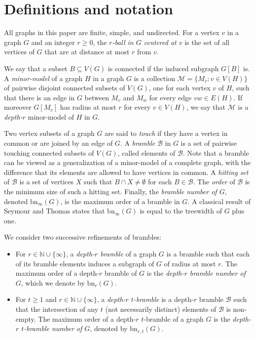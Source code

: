 \documentclass[final]{dmtcs-episciences}
\theoremstyle{definition}
\theoremstyle{remark}
\newcommand{\dep}{depth}
\newcommand{\bn}{\ensuremath{\mathrm{bn}}}
\renewcommand{\geq}{\geqslant}
\begin{document}
\section{Definitions and notation}\label{sec:def}





All graphs in this paper are finite, simple, and undirected. 
For a vertex $v$ in a graph $G$ and an integer $r\geq 0$, the \emph{$r$-ball in $G$ centered at $v$} is the set of all vertices of $G$ that are at distance at most $r$ from $v$. 

We say that a subset $B\subseteq V(G)$ is connected if the induced subgraph $G[B]$ is.
A {\em minor-model} of a graph $H$ in a graph $G$ is a collection $\mathcal{M}=\{M_v: v\in V(H)\}$ of pairwise disjoint connected subsets of $V(G)$, one for each vertex $v$ of $H$, such that there is an edge in $G$ between $M_v$ and $M_w$ for every edge $vw\in E(H)$. 
If moreover $G[M_v]$ has radius at most $r$ for every $v\in V(H)$, we say that $\mathcal{M}$ is  a {\em depth-$r$} minor-model of $H$ in $G$.

Two vertex subsets of a graph $G$ are said to \emph{touch} if they have a vertex in common or are joined by an edge of $G$.  A \emph{bramble} $\mathcal{B}$ in $G$ is a set of pairwise touching connected subsets of $V(G)$, called elements of $\mathcal{B}$. Note that a bramble can be viewed as a generalization of a minor-model of a complete graph, with the difference that its elements are allowed to have vertices in common.  A \emph{hitting set} of $\mathcal{B}$ is a set of vertices $X$ such that $B \cap X \neq \emptyset$ for each $B\in \mathcal{B}$. The \emph{order} of $\mathcal{B}$ is the minimum size of such a hitting set. Finally, the \emph{bramble number of $G$}, denoted $\bn_\infty(G)$, is the maximum order of a bramble in $G$. A classical result of Seymour and Thomas \cite{ST1993} states that $\bn_\infty(G)$ is equal to the treewidth of $G$ plus one.

\smallskip

We consider two successive refinements of brambles:

\begin{itemize}
\item  For $r\in \mathbb{N}\cup \{\infty\}$, a \emph{\dep-$r$ bramble} of a graph $G$ is a bramble such that each of its bramble elements induces a subgraph of $G$ of radius at most $r$.
The maximum order of a \dep-$r$ bramble of $G$ is the \emph{\dep-$r$ bramble number of $G$}, which we denote by $\bn_r(G)$. 

\item For $t\geq 1$ and $r \in \mathbb{N}\cup \{\infty\}$, a \emph{\dep-$r$ $t$-bramble} is a \dep-$r$ bramble $\mathcal{B}$ such that the intersection of any $t$ (not necessarily distinct) elements of $\mathcal{B}$ is non-empty.
The maximum order of a \dep-$r$ $t$-bramble of a graph $G$ is the \emph{\dep-$r$ $t$-bramble number of $G$}, denoted by $\bn_{r,t}(G)$.
\end{itemize} 
\end{document}
